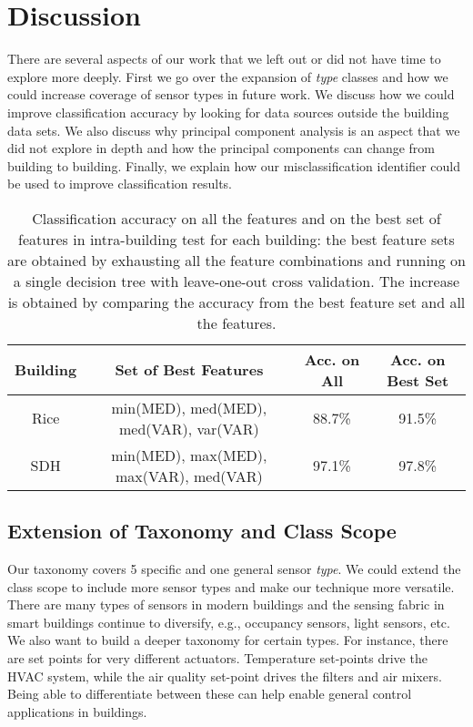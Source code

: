 \section{Discussion}
There are several aspects of our work that we left out or did not have time to explore more deeply.
First we go over the expansion of \emph{type} classes and how we could increase coverage of sensor types in future work. 
We discuss how we could improve classification accuracy
by looking for data sources outside the building data sets. We also discuss why principal component analysis is an aspect that we
did not explore in depth and how the principal components can change from building to building.  Finally, we 
explain how our misclassification identifier could be used to improve classification results.

\begin{table*}
    \centering %
    \begin{tabular}{c|c|c|c}%
        \hline %
        Building & Set of Best Features & Acc. on All & Acc. on Best Set \\ %
        \hline\hline %
        Rice & min(MED), med(MED), med(VAR), var(VAR) & 88.7\% & 91.5\% \\ \hline
        SDH & min(MED), max(MED), max(VAR), med(VAR) & 97.1\% & 97.8\% \\\hline
    \end{tabular}
    \caption{Classification accuracy on all the features and on the best set of features in intra-building test for each building: the best feature sets are obtained by exhausting all the feature combinations and running on a single decision tree with leave-one-out cross validation. The increase is obtained by comparing the accuracy from the best feature set and all the features.}
    \label{table:feature} %
\end{table*}

\subsection{Extension of Taxonomy and Class Scope}
Our taxonomy covers 5 specific and one general sensor \emph{type}. We could extend the class scope to include more sensor types and make our technique more versatile. There are many types of sensors in modern buildings and the sensing fabric in smart buildings continue to diversify, e.g., occupancy sensors, light sensors, etc. We also want to build a deeper taxonomy for certain types.  
For instance, there are set points for very different actuators.  Temperature set-points drive the HVAC system, while the air quality set-point drives the filters and air mixers. Being able to differentiate between these can help enable general control applications in buildings.

